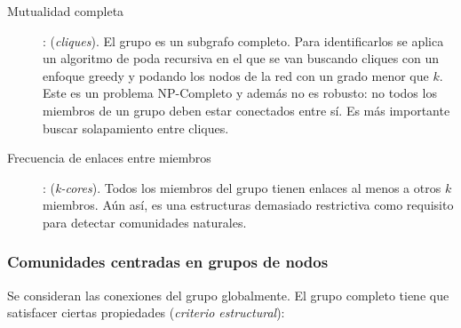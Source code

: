 \documentclass[10pt,spanish, landscape, twocolumn]{article}
\begin{document}
\begin{description}
    \item[Mutualidad completa]: (\textit{\textcolor{temaseis}{cliques}}). El grupo es un subgrafo completo. Para identificarlos se aplica un algoritmo de poda recursiva en el que se van buscando cliques con un enfoque greedy y podando los nodos de la red con un grado menor que $k$. Este es un problema NP-Completo y además no es robusto: no todos los miembros de un grupo deben estar conectados entre sí. Es más importante buscar solapamiento entre cliques.
    \item[Frecuencia de enlaces entre miembros]: (\textit{\textcolor{temaseis}{k-cores}}). Todos los miembros del grupo tienen enlaces al menos a otros $k$ miembros. Aún así, es una estructuras demasiado restrictiva como requisito para detectar comunidades naturales.
\end{description}

\subsubsection{\textcolor{temaseis}Comunidades centradas en grupos de nodos}
Se consideran las conexiones del grupo globalmente. El grupo completo tiene que satisfacer ciertas propiedades (\textit{\textcolor{temaseis}{criterio estructural}}):
\end{document}

